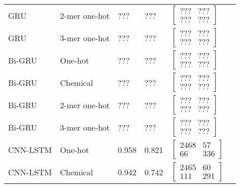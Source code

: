 \begin{longtable}{llllll}
    GRU & 2-mer one-hot & ??? & ??? &
    $\begin{bmatrix}
        ??? & ???\\ 
        ??? & ???
    \end{bmatrix}$
    \\

    GRU & 3-mer one-hot & ??? & ??? &
    $\begin{bmatrix}
        ??? & ???\\ 
        ??? & ???
    \end{bmatrix}$
    \\\midrule


    Bi-GRU & One-hot & ??? & ??? &
    $\begin{bmatrix}
        ??? & ???\\ 
        ??? & ???
    \end{bmatrix}$
    \\

    Bi-GRU & Chemical & ??? & ??? &
    $\begin{bmatrix}
        ??? & ???\\ 
        ??? & ???
    \end{bmatrix}$
    \\

    Bi-GRU & 2-mer one-hot & ??? & ??? &
    $\begin{bmatrix}
        ??? & ???\\ 
        ??? & ???
    \end{bmatrix}$
    \\

    Bi-GRU & 3-mer one-hot & ??? & ??? &
    $\begin{bmatrix}
        ??? & ???\\ 
        ??? & ???
    \end{bmatrix}$
    \\\midrule


    CNN-LSTM & One-hot & 0.958 & 0.821 &
    $\begin{bmatrix}
        2468 & 57\\
        66 & 336
    \end{bmatrix}$
    \\

    CNN-LSTM & Chemical & 0.942 & 0.742 &
    $\begin{bmatrix}
        2465 & 60\\ 
        111 & 291
    \end{bmatrix}$
    \\


\end{longtable}
